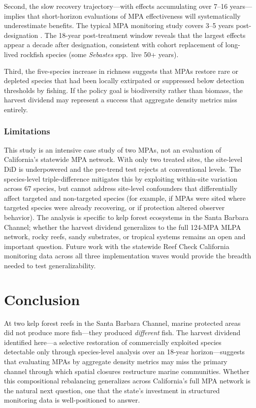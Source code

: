 \documentclass[12pt]{article}
\begin{document}
Second, the slow recovery trajectory---with effects accumulating over 7--16 years---implies that short-horizon evaluations of MPA effectiveness will systematically underestimate benefits. The typical MPA monitoring study covers 3--5 years post-designation \citep{lester2009biological}. The 18-year post-treatment window reveals that the largest effects appear a decade after designation, consistent with cohort replacement of long-lived rockfish species (some \textit{Sebastes} spp.\ live 50+ years).

Third, the five-species increase in richness suggests that MPAs restore rare or depleted species that had been locally extirpated or suppressed below detection thresholds by fishing. If the policy goal is biodiversity rather than biomass, the harvest dividend may represent a success that aggregate density metrics miss entirely.

\subsubsection*{Limitations} This study is an intensive case study of two MPAs, not an evaluation of California's statewide MPA network. With only two treated sites, the site-level DiD is underpowered and the pre-trend test rejects at conventional levels. The species-level triple-difference mitigates this by exploiting within-site variation across 67 species, but cannot address site-level confounders that differentially affect targeted and non-targeted species (for example, if MPAs were sited where targeted species were already recovering, or if protection altered observer behavior). The analysis is specific to kelp forest ecosystems in the Santa Barbara Channel; whether the harvest dividend generalizes to the full 124-MPA MLPA network, rocky reefs, sandy substrates, or tropical systems remains an open and important question. Future work with the statewide Reef Check California monitoring data across all three implementation waves would provide the breadth needed to test generalizability.


\section{Conclusion}

At two kelp forest reefs in the Santa Barbara Channel, marine protected areas did not produce more fish---they produced \textit{different} fish. The harvest dividend identified here---a selective restoration of commercially exploited species detectable only through species-level analysis over an 18-year horizon---suggests that evaluating MPAs by aggregate density metrics may miss the primary channel through which spatial closures restructure marine communities. Whether this compositional rebalancing generalizes across California's full MPA network is the natural next question, one that the state's investment in structured monitoring data is well-positioned to answer.
\end{document}
